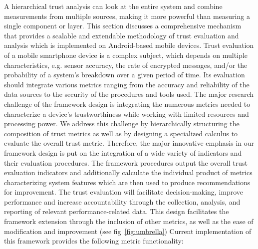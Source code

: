 A hierarchical trust analysis can look at the entire system and combine measurements from multiple sources, making
it more powerful than measuring a single component or layer.
This section discusses a comprehensive mechanism that provides a scalable and extendable methodology of trust
 evaluation and analysis which is implemented on Android-based mobile devices. 
Trust evaluation of a mobile smartphone device is a complex subject, which depends on multiple characteristics, 
e.g. sensor accuracy, the rate of encrypted messages, 
 and/or the probability of a system's breakdown over a given period of time. Its evaluation should integrate various metrics ranging from the accuracy and reliability of the data sources to the security of the procedures and tools used. The major research challenge of the framework design is integrating the numerous metrics needed to characterize a device's trustworthiness while working with limited resources and processing power. 
We address this challenge by hierarchically structuring the composition of trust metrics as well as by designing a specialized calculus to evaluate the overall trust metric. 
Therefore, the major innovative emphasis in our framework design is put on the integration of a wide variety of indicators and their evaluation procedures. The framework procedures output the overall trust evaluation indicators and additionally calculate the individual product of metrics characterizing system features which are then used to produce recommendations for improvement. The trust evaluation will facilitate decision-making, improve performance and increase accountability through the collection, analysis, and reporting of relevant performance-related data. This design facilitates the framework extension through
 the inclusion of other metrics, as well as the ease of modification and improvement (see fig~\ref{fig:umbrella})
Current implementation of this framework provides the following metric functionality: 

